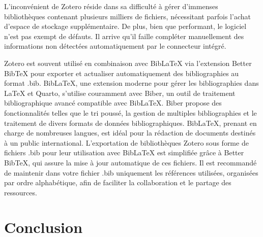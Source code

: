 \documentclass[
  letterpaper,
]{scrbook}
\begin{document}
L'inconvénient de Zotero réside dans sa difficulté à gérer d'immenses
bibliothèques contenant plusieurs milliers de fichiers, nécessitant
parfois l'achat d'espace de stockage supplémentaire. De plus, bien que
performant, le logiciel n'est pas exempt de défauts. Il arrive qu'il
faille compléter manuellement des informations non détectées
automatiquement par le connecteur intégré.

Zotero est souvent utilisé en combinaison avec BibLaTeX via l'extension
Better BibTeX pour exporter et actualiser automatiquement des
bibliographies au format .bib. BibLaTeX, une extension moderne pour
gérer les bibliographies dans LaTeX et Quarto, s'utilise couramment avec
Biber, un outil de traitement bibliographique avancé compatible avec
BibLaTeX. Biber propose des fonctionnalités telles que le tri poussé, la
gestion de multiples bibliographies et le traitement de divers formats
de données bibliographiques. BibLaTeX, prenant en charge de nombreuses
langues, est idéal pour la rédaction de documents destinés à un public
international. L'exportation de bibliothèques Zotero sous forme de
fichiers .bib pour leur utilisation avec BibLaTeX est simplifiée grâce à
Better BibTeX, qui assure la mise à jour automatique de ces fichiers. Il
est recommandé de maintenir dans votre fichier .bib uniquement les
références utilisées, organisées par ordre alphabétique, afin de
faciliter la collaboration et le partage des ressources.

\hypertarget{conclusion-3}{%
\section{Conclusion}\label{conclusion-3}}
\end{document}

